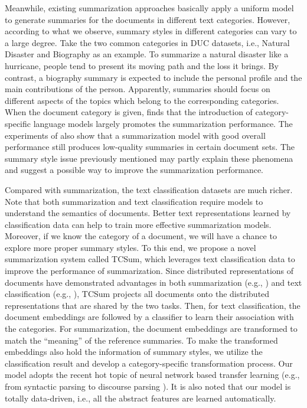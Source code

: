 \documentclass[letterpaper]{article}
\begin{document}
Meanwhile, existing summarization approaches basically apply a uniform model to generate summaries for the documents in different text categories. 
However, according to what we observe, summary styles in different categories can vary to a large degree. 
Take the two common categories in DUC datasets, i.e., Natural Disaster and Biography as an example.
To summarize a natural disaster like a hurricane, people tend to present its moving path and the loss it brings.
By contrast, a biography summary is expected to include the personal profile and the main contributions of the person.
Apparently, summaries should focus on different aspects of the topics which belong to the corresponding categories.
When the document category is given, \cite{kedzie-mckeown-diaz:2015:ACL-IJCNLP}
 finds that the introduction of category-specific language models largely promotes the summarization performance.
The experiments of \cite{wan2015multi} also show that a summarization model with good overall performance still produces low-quality summaries in certain document sets.
The summary style issue previously mentioned may partly explain these phenomena and suggest a possible way to improve the summarization performance.

Compared with summarization, the text classification datasets are much richer.
Note that both summarization and text classification require models to understand the semantics of documents.
Better text representations learned by classification data can help to train more effective summarization models.
Moreover, if we know the category of a document, we will have a chance to explore more proper summary styles.
To this end, we propose a novel summarization system called TCSum, which leverages text classification data to improve the performance of summarization.
Since distributed representations of documents have demonstrated advantages in both summarization (e.g., \cite{kobayashi-noguchi-yatsuka:2015:EMNLP}) and text classification (e.g., \cite{lai2015recurrent}), TCSum projects all documents onto the distributed representations that are shared by the two tasks.
Then, for text classification, the document embeddings are followed by a classifier to learn their association with the categories. 
For summarization, the document embeddings are transformed to match the ``meaning'' of the reference summaries.
To make the transformed embeddings also hold the information of summary styles, we utilize the classification result and develop a category-specific transformation process.
Our model adopts the recent hot topic of neural network based transfer learning (e.g., from syntactic parsing to discourse parsing \cite{li2014recursive}).
It is also noted that our model is totally data-driven, i.e., all the abstract features are learned automatically.
\end{document}
